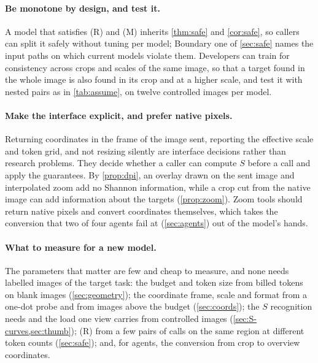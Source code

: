 \paragraph{Be monotone by design, and test it.} A model that satisfies (R) and (M) inherits \cref{thm:safe} and \cref{cor:safe}, so callers can split it safely without tuning per model; Boundary one of \cref{sec:safe} names the input paths on which current models violate them. Developers can train for consistency across crops and scales of the same image, so that a target found in the whole image is also found in its crop and at a higher scale, and test it with nested pairs as in \cref{tab:assume}, on twelve controlled images per model.

\paragraph{Make the interface explicit, and prefer native pixels.} Returning coordinates in the frame of the image sent, reporting the effective scale and token grid, and not resizing silently are interface decisions rather than research problems. They decide whether a caller can compute $S$ before a call and apply the guarantees. By \cref{prop:dpi}, an overlay drawn on the sent image and interpolated zoom add no Shannon information, while a crop cut from the native image can add information about the targets (\cref{prop:zoom}). Zoom tools should return native pixels and convert coordinates themselves, which takes the conversion that two of four agents fail at (\cref{sec:agents}) out of the model's hands.

\paragraph{What to measure for a new model.} The parameters that matter are few and cheap to measure, and none needs labelled images of the target task: the budget and token size from billed tokens on blank images (\cref{sec:geometry}); the coordinate frame, scale and format from a one-dot probe and from images above the budget (\cref{sec:coords}); the $S$ recognition needs and the load one view carries from controlled images (\cref{sec:S-curves,sec:thumb}); (R) from a few pairs of calls on the same region at different token counts (\cref{sec:safe}); and, for agents, the conversion from crop to overview coordinates.
